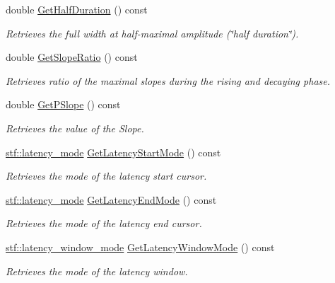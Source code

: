 \begin{DoxyCompactItemize}
double \hyperlink{classRecording_a9d09f4cec914f37294f392711aff6b5f}{GetHalfDuration} () const 
\begin{DoxyCompactList}\small\item\em Retrieves the full width at half-\/maximal amplitude (\char`\"{}half duration\char`\"{}). \item\end{DoxyCompactList}\item 
double \hyperlink{classRecording_a73c170fcc503cbaf4352a4322129d3f0}{GetSlopeRatio} () const 
\begin{DoxyCompactList}\small\item\em Retrieves ratio of the maximal slopes during the rising and decaying phase. \item\end{DoxyCompactList}\item 
double \hyperlink{classRecording_a6575bf91ef1f6e3cf58e8f75ce3691fe}{GetPSlope} () const 
\begin{DoxyCompactList}\small\item\em Retrieves the value of the Slope. \item\end{DoxyCompactList}\item 
\hyperlink{group__stfgen_ga738f9934a45a9d2d81cb0a3de0375c99}{stf::latency\_\-mode} \hyperlink{classRecording_ae82a0d76aa6454a7187e32399bcd5c8c}{GetLatencyStartMode} () const 
\begin{DoxyCompactList}\small\item\em Retrieves the mode of the latency start cursor. \item\end{DoxyCompactList}\item 
\hyperlink{group__stfgen_ga738f9934a45a9d2d81cb0a3de0375c99}{stf::latency\_\-mode} \hyperlink{classRecording_acef949762142160e2014fcec24aebf32}{GetLatencyEndMode} () const 
\begin{DoxyCompactList}\small\item\em Retrieves the mode of the latency end cursor. \item\end{DoxyCompactList}\item 
\hyperlink{group__stfgen_gae034ed0eec6bdaba3b23d3b2184f799d}{stf::latency\_\-window\_\-mode} \hyperlink{classRecording_a534771ad7f73eaf8c038efdc3887ccda}{GetLatencyWindowMode} () const 
\begin{DoxyCompactList}\small\item\em Retrieves the mode of the latency window. \item\end{DoxyCompactList}\item 

\end{DoxyCompactItemize}
